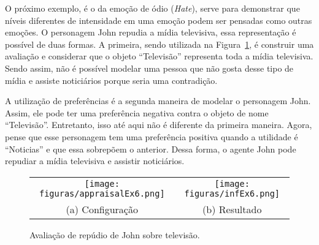 

O próximo exemplo, é o da emoção de ódio (\emph{Hate}), serve para demonstrar
que níveis diferentes de intensidade em uma emoção podem ser pensadas como
outras emoções. O personagem John repudia a mídia televisiva, essa
representação é possível de duas formas. A primeira, sendo utilizada na
Figura~\ref{fig:tp:cdu:ex6}, é construir uma avaliação e considerar que o
objeto ``Televisão'' representa toda a mídia televisiva. Sendo assim,
não é possível modelar uma pessoa que não gosta desse tipo de mídia e assiste
noticiários porque seria uma contradição.

A utilização de preferências é a segunda maneira de modelar o personagem John.
Assim, ele pode ter uma preferência negativa contra o objeto de nome
``Televisão''. Entretanto, isso até aqui não é diferente da primeira maneira.
Agora, pense que esse personagem tem uma preferência positiva quando a
utilidade é ``Noticias'' e que essa sobrepõem o anterior. Dessa forma, o
agente John pode repudiar a mídia televisiva e assistir noticiários.

\begin{figure}
  \centering
  \begin{tabular}{cc}
  \texttt{[image: figuras/appraisalEx6.png]} & \texttt{[image: figuras/infEx6.png]} \\
  (a) Configuração & (b) Resultado
  \end{tabular}
  \caption{Avaliação de repúdio de John sobre televisão.}
  \label{fig:tp:cdu:ex6}
\end{figure}


